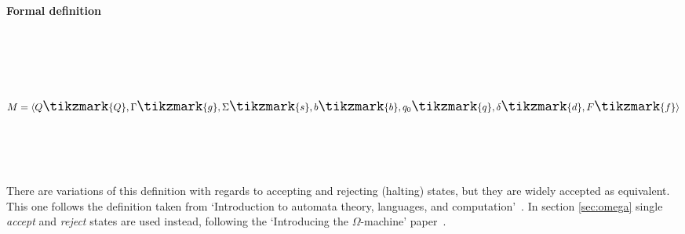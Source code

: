 \documentclass[12pt]{article}
\begin{document}
			\paragraph{Formal definition~\cite{Hopcroft1979}}\hfill\\\\\\\\
				\[ \Large	M= \langle Q\tikzmark{Q} , \Gamma\tikzmark{g} , \Sigma\tikzmark{s} , b\tikzmark{b}  ,q_{0}\tikzmark{q} , \delta\tikzmark{d} , F\tikzmark{f}\rangle \]
				\\\\\\\\
				There are variations of this definition with regards to accepting and rejecting (halting) states, but they are widely accepted as equivalent. This one follows the definition taken from `Introduction to automata theory, languages, and computation'~\cite{Hopcroft1979}. In section \ref{sec:omega} single \textit{accept} and \textit{reject} states are used instead, following the `Introducing the $\Omega$-machine' paper~\cite{Zhang2014}.
		
\end{document}
